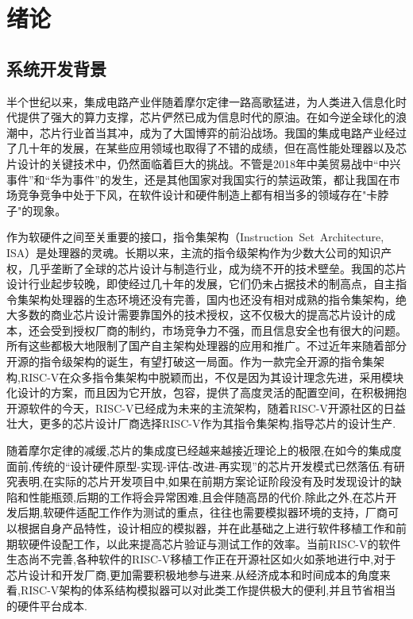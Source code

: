 
\chapter{绪论}

\section{系统开发背景}
半个世纪以来，集成电路产业伴随着摩尔定律一路高歌猛进，为人类进入信息化时代提供了强大的算力支撑，芯片俨然已成为信息时代的原油。在如今逆全球化的浪潮中，芯片行业首当其冲，成为了大国博弈的前沿战场。我国的集成电路产业经过了几十年的发展，在某些应用领域也取得了不错的成绩，但在高性能处理器以及芯片设计的关键技术中，仍然面临着巨大的挑战\cite{huzhenbo,huzhenbo1}。不管是2018年中美贸易战中“中兴事件”和“华为事件”的发生，还是其他国家对我国实行的禁运政策，都让我国在市场竞争竞争中处于下风，在软件设计和硬件制造上都有相当多的领域存在"卡脖子"的现象。


作为软硬件之间至关重要的接口，指令集架构（Instruction Set Architecture, ISA）是处理器的灵魂。长期以来，主流的指令级架构作为少数大公司的知识产权，几乎垄断了全球的芯片设计与制造行业，成为绕不开的技术壁垒。我国的芯片设计行业起步较晚，即使经过几十年的发展，它们仍未占据技术的制高点，自主指令集架构处理器的生态环境还没有完善，国内也还没有相对成熟的指令集架构，绝大多数的商业芯片设计需要靠国外的技术授权，这不仅极大的提高芯片设计的成本，还会受到授权厂商的制约，市场竞争力不强，而且信息安全也有很大的问题。所有这些都极大地限制了国产自主架构处理器的应用和推广。不过近年来随着部分开源的指令级架构的诞生，有望打破这一局面。作为一款完全开源的指令集架构,RISC-V在众多指令集架构中脱颖而出，不仅是因为其设计理念先进，采用模块化设计的方案，而且因为它开放，包容，提供了高度灵活的配置空间，在积极拥抱开源软件的今天，RISC-V已经成为未来的主流架构，随着RISC-V开源社区的日益壮大，更多的芯片设计厂商选择RISC-V作为其指令集架构,指导芯片的设计生产\cite{包云岗2022开源芯片生态技术体系构建面临的机遇与挑战}.

随着摩尔定律的减缓,芯片的集成度已经越来越接近理论上的极限,在如今的集成度面前,传统的“设计硬件原型-实现-评估-改进-再实现”的芯片开发模式已然落伍\cite{jichengdu}.有研究表明,在实际的芯片开发项目中,如果在前期方案论证阶段没有及时发现设计的缺陷和性能瓶颈,后期的工作将会异常困难,且会伴随高昂的代价\cite{buzhou}.除此之外,在芯片开发后期,软硬件适配工作作为测试的重点\cite{黄聪会2012软件移植理论与技术研究}，往往也需要模拟器环境的支持\cite{butko2012accuracy}，厂商可以根据自身产品特性，设计相应的模拟器，并在此基础之上进行软件移植工作和前期软硬件设配工作，以此来提高芯片验证与测试工作的效率。当前RISC-V的软件生态尚不完善,各种软件的RISC-V移植工作正在开源社区如火如荼地进行中,对于芯片设计和开发厂商,更加需要积极地参与进来.从经济成本和时间成本的角度来看,RISC-V架构的体系结构模拟器可以对此类工作提供极大的便利,并且节省相当的硬件平台成本.


